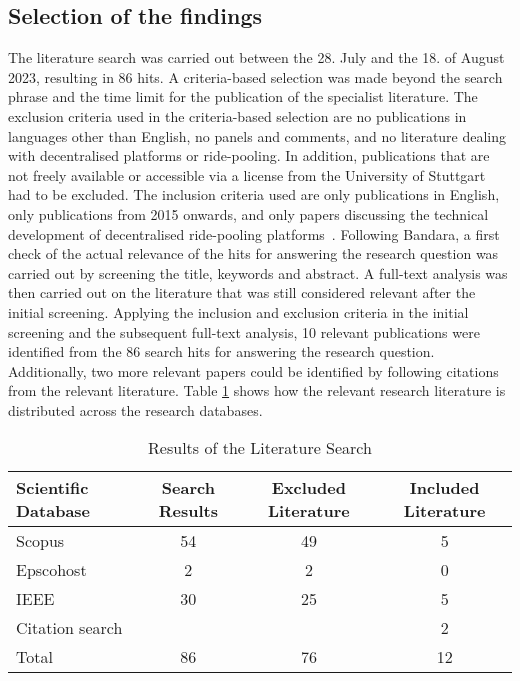 \subsection{Selection of the findings}
The literature search was carried out between the 28. July and the 18. of August 2023, resulting in 86 hits. A criteria-based selection was made beyond the search phrase and the time limit for the publication of the specialist literature. The exclusion criteria used in the criteria-based selection are no publications in languages other than English, no panels and comments, and no literature dealing with decentralised platforms or ride-pooling. In addition, publications that are not freely available or accessible via a license from the University of Stuttgart had to be excluded. The inclusion criteria used are only publications in English, only publications from 2015 onwards, and only papers discussing the technical development of decentralised ride-pooling platforms~\cite{Bandara.2015}.
Following Bandara, a first check of the actual relevance of the hits for answering the research question was carried out by screening the title, keywords and abstract. A full-text analysis was then carried out on the literature that was still considered relevant after the initial screening. Applying the inclusion and exclusion criteria in the initial screening and the subsequent full-text analysis, 10 relevant publications were identified from the 86 search hits for answering the research question. Additionally, two more relevant papers could be identified by following citations from the relevant literature.  Table \ref{tab:litSearchResults} shows how the relevant research literature is distributed across the research databases. 


\begin{table}[h]
\centering
\caption{Results of the Literature Search}
\label{tab:litSearchResults}
\begin{tabular}{|l|c|c|c|}
\hline
Scientific Database & Search Results & Excluded Literature & Included Literature \\ \hline
Scopus & 54 & 49 & 5 \\ \hline
Epscohost & 2 & 2 & 0 \\ \hline
IEEE & 30 & 25 & 5 \\ \hline
Citation search &  &  & 2 \\ \hline \hline
Total & 86 & 76 & 12 \\ \hline
\end{tabular}
\end{table}

